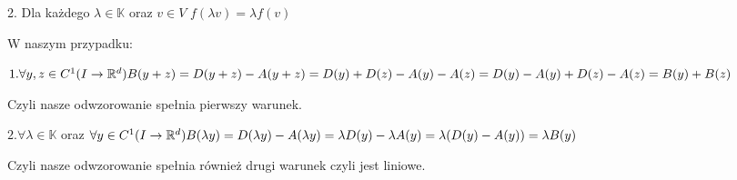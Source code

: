\documentclass[12pt]{article}
\begin{document}
\begin{center}
\large 2. Dla każdego $\lambda\in\mathbb{K}$ oraz $v\in{V}$  $f(\lambda{v})=\lambda{f}(v)$ 
\end{center}
\noindent W naszym przypadku:
\begin{center}
\large $1. \forall y,z\in{C}^1(I\to\mathbb{R}^d) \newline B(y+z)=D(y+z)-A(y+z)=D(y)+D(z)-A(y)-A(z)=D(y)-A(y)+D(z)-A(z)=B(y)+B(z)$ 
\end{center}
Czyli nasze odwzorowanie spełnia pierwszy warunek.
\begin{center}
\large $2. \forall \lambda\in\mathbb{K}$ oraz $\forall y\in{C}^1(I\to\mathbb{R}^d) \newline B(\lambda{y})=D(\lambda{y})-A(\lambda{y})=\lambda{D}(y)-\lambda{A}(y)=\lambda(D(y)-A(y))=
\lambda{B}(y)$
\end{center}
Czyli nasze odwzorowanie spełnia również drugi warunek czyli jest liniowe. 
\end{document}
